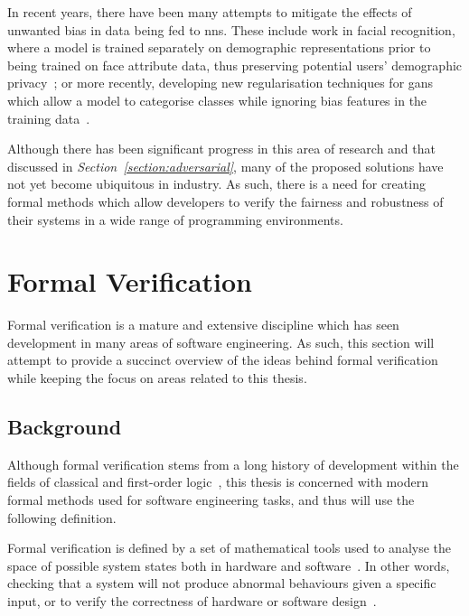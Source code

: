 In recent years, there have been many attempts to mitigate the effects of unwanted bias in 
data being fed to \glspl{nn}. These include work in facial recognition, where a model is trained
separately on demographic representations prior to being trained on face attribute data, thus 
preserving potential users' demographic privacy~\citep{ryu2018}; or more recently, developing new regularisation techniques for \Glspl{gan} which 
allow a model to categorise classes while ignoring bias features in the training data~\citep{kim2019}.


Although there has been significant progress in this area of research and that discussed in \textit{Section~\ref{section:adversarial}}, 
many of the proposed solutions
have not yet become ubiquitous in industry. As such, there
is a need for creating formal methods which allow developers to verify the fairness and robustness of their
systems in a wide range of programming environments.

\section{Formal Verification}

Formal verification is a mature and extensive discipline which has seen development in many areas 
of software engineering. As such, this section will attempt to provide a succinct 
overview of the ideas behind formal verification while keeping the focus on areas
related to this thesis.

\subsection{Background}

Although formal verification stems from a long history of development within the fields
of classical and first-order logic~\citep{smith2011, boole2009, russell1937}, this thesis is concerned with modern formal methods
used for software engineering tasks, and thus will use the following definition.

Formal verification is defined by a set
of mathematical tools used to analyse the space of possible system 
states both in hardware and software~\citep{seligman2015}. In other words,
checking that a system will not produce abnormal behaviours given a 
specific input, or to verify the correctness of hardware or software design~\citep{grout2008}.

